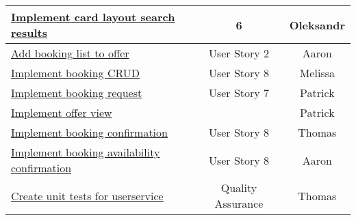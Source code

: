 \begin{table}[h]
\begin{tabular}{|l|c|c|}
        \hline
        \href{https://gitlab.rz.uni-bamberg.de/swt/teaching/2021-ws/swt-swl-b/group-a/-/issues/79}{Implement card layout search results} & 6 & Oleksandr \\
        \hline
        \href{https://gitlab.rz.uni-bamberg.de/swt/teaching/2021-ws/swt-swl-b/group-a/-/issues/74}{Add booking list to offer} & User Story 2 & Aaron \\
        \hline
        \href{https://gitlab.rz.uni-bamberg.de/swt/teaching/2021-ws/swt-swl-b/group-a/-/issues/73}{Implement booking CRUD} & User Story 8 & Melissa \\
        \hline
        \href{https://gitlab.rz.uni-bamberg.de/swt/teaching/2021-ws/swt-swl-b/group-a/-/issues/69}{Implement booking request} & User Story 7 & Patrick \\
        \hline
        \href{https://gitlab.rz.uni-bamberg.de/swt/teaching/2021-ws/swt-swl-b/group-a/-/issues/84}{Implement offer view} &  & Patrick \\
        \hline
        \href{https://gitlab.rz.uni-bamberg.de/swt/teaching/2021-ws/swt-swl-b/group-a/-/issues/71}{Implement booking confirmation} & User Story 8 & Thomas \\
        \hline
        \href{https://gitlab.rz.uni-bamberg.de/swt/teaching/2021-ws/swt-swl-b/group-a/-/issues/70}{Implement booking availability confirmation} & User Story 8 & Aaron \\
        \hline
        \href{https://gitlab.rz.uni-bamberg.de/swt/teaching/2021-ws/swt-swl-b/group-a/-/issues/72}{Create unit tests for userservice} & Quality Assurance & Thomas \\
        \hline
    \end{tabular}
\end{table}